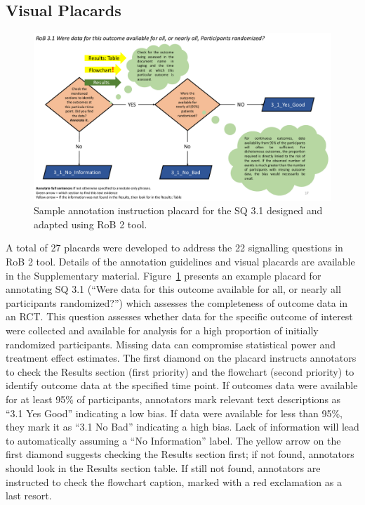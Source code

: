 \documentclass[sn-mathphys,Numbered]{sn-jnl}%
\theoremstyle{thmstyleone}%
\theoremstyle{thmstyletwo}%
\theoremstyle{thmstylethree}%
\begin{document}
\subsection{Visual Placards}
\label{result:placards}
%
%
%
%
\begin{figure}
    \centering
    \includegraphics[width=0.80\columnwidth]{figures/placard_3_1.pdf}
    \caption{Sample annotation instruction placard for the SQ 3.1 designed and adapted using RoB 2 tool.}
    \label{fig:placard}
\end{figure}
%
%
%
A total of 27 placards were developed to address the 22 signalling questions in RoB 2 tool. 
Details of the annotation guidelines and visual placards are available in the Supplementary material.
Figure~\ref{fig:placard} presents an example placard for annotating SQ 3.1 (``Were data for this outcome available for all, or nearly all participants randomized?'') which assesses the completeness of outcome data in an RCT.
This question assesses whether data for the specific outcome of interest were collected and available for analysis for a high proportion of initially randomized participants.
Missing data can compromise statistical power and treatment effect estimates. 
The first diamond on the placard instructs annotators to check the Results section (first priority) and the flowchart (second priority) to identify outcome data at the specified time point.
If outcomes data were available for at least 95\% of participants, annotators mark relevant text descriptions as ``3.1 Yes Good'' indicating a low bias.
If data were available for less than 95\%, they mark it as ``3.1 No Bad'' indicating a high bias.
Lack of information will lead to automatically assuming a ``No Information'' label.
The yellow arrow on the first diamond suggests checking the Results section first; if not found, annotators should look in the Results section table.
If still not found, annotators are instructed to check the flowchart caption, marked with a red exclamation as a last resort.
%
%
%
\end{document}
